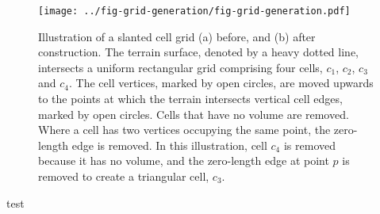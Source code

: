 \documentclass{article}
\begin{document}
\begin{figure}
	\centering
	\texttt{[image: ../fig-grid-generation/fig-grid-generation.pdf]}
	\caption{Illustration of a slanted cell grid (a) before, and (b) after construction.
	The terrain surface, denoted by a heavy dotted line, intersects a uniform rectangular grid comprising four cells, $c_1$, $c_2$, $c_3$ and $c_4$.  The cell vertices, marked by open circles, are moved upwards to the points at which the terrain intersects vertical cell edges, marked by open circles.  Cells that have no volume are removed.  Where a cell has two vertices occupying the same point, the zero-length edge is removed.  In this illustration, cell $c_4$ is removed because it has no volume, and the zero-length edge at point $p$ is removed to create a triangular cell, $c_3$.}
	\label{fig:grid-generation}
\end{figure}
test
\end{document}
